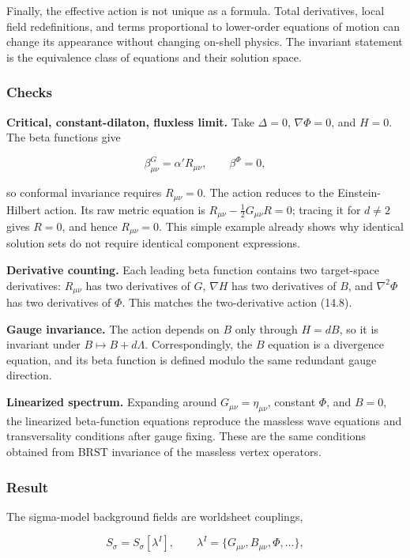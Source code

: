 \documentclass[
  10pt,
  a4paper,
  openany]{book}
\begin{document}
Finally, the effective action is not unique as a formula. Total
derivatives, local field redefinitions, and terms proportional to
lower-order equations of motion can change its appearance without
changing on-shell physics. The invariant statement is the equivalence
class of equations and their solution space.

\subsubsection{Checks}\label{checks-29}

\textbf{Critical, constant-dilaton, fluxless limit.} Take \(\Delta=0\),
\(\nabla\Phi=0\), and \(H=0\). The beta functions give

\[
\beta^G_{\mu\nu}=\alpha'R_{\mu\nu},
\qquad
\beta^\Phi=0,
\]

so conformal invariance requires \(R_{\mu\nu}=0\). The action reduces to
the Einstein-Hilbert action. Its raw metric equation is
\(R_{\mu\nu}-\tfrac12G_{\mu\nu}R=0\); tracing it for \(d\neq2\) gives
\(R=0\), and hence \(R_{\mu\nu}=0\). This simple example already shows
why identical solution sets do not require identical component
expressions.

\textbf{Derivative counting.} Each leading beta function contains two
target-space derivatives: \(R_{\mu\nu}\) has two derivatives of \(G\),
\(\nabla H\) has two derivatives of \(B\), and \(\nabla^2\Phi\) has two
derivatives of \(\Phi\). This matches the two-derivative action (14.8).

\textbf{Gauge invariance.} The action depends on \(B\) only through
\(H=dB\), so it is invariant under \(B\mapsto B+d\Lambda\).
Correspondingly, the \(B\) equation is a divergence equation, and its
beta function is defined modulo the same redundant gauge direction.

\textbf{Linearized spectrum.} Expanding around
\(G_{\mu\nu}=\eta_{\mu\nu}\), constant \(\Phi\), and \(B=0\), the
linearized beta-function equations reproduce the massless wave equations
and transversality conditions after gauge fixing. These are the same
conditions obtained from BRST invariance of the massless vertex
operators.

\subsubsection{Result}\label{result-33}

The sigma-model background fields are worldsheet couplings,

\[
S_\sigma=S_\sigma[\lambda^I],
\qquad
\lambda^I=\{G_{\mu\nu},B_{\mu\nu},\Phi,\ldots\},
\]
\end{document}
